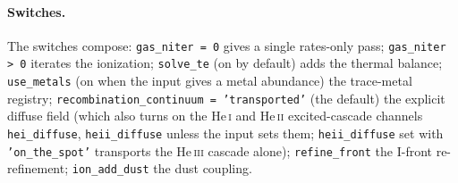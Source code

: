 \documentclass[english,a4paper]{my_memo}
\newcommand{\code}[1]{\texttt{#1}}
\begin{document}
\paragraph{Switches.}  The switches compose: \code{gas\_niter = 0} gives a single rates-only
pass; \code{gas\_niter > 0} iterates the ionization; \code{solve\_te}
(on by default) adds the thermal balance; \code{use\_metals} (on when the
input gives a metal abundance) the trace-metal registry;
\code{recombination\_continuum = 'transported'} (the default) the explicit
diffuse field (which also turns on the He\,\textsc{i} and He\,\textsc{ii}
excited-cascade channels \code{hei\_diffuse}, \code{heii\_diffuse} unless
the input sets them; \code{heii\_diffuse} set with \code{'on\_the\_spot'}
transports the He\,\textsc{iii} cascade alone);
\code{refine\_front} the I-front re-refinement; \code{ion\_add\_dust}
the dust coupling.
\end{document}
